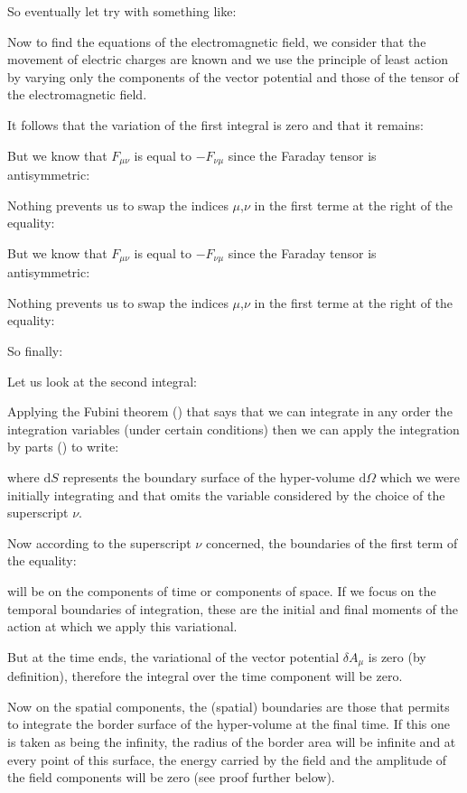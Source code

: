 	So eventually let try with something like:
	
	Now to find the equations of the electromagnetic field, we consider that the movement of electric charges are known and we use the principle of least action by varying only the components of the vector potential and those of the tensor of the electromagnetic field.

	It follows that the variation of the first integral is zero and that it remains:
	
	But we know that $F_{\mu\nu}$ is equal to $-F_{\nu\mu}$ since the Faraday tensor is antisymmetric:
	
	Nothing prevents us to swap the indices $\mu$,$\nu$ in the first terme at the right of the equality:
	
	But we know that $F_{\mu\nu}$ is equal to $-F_{\nu\mu}$ since the Faraday tensor is antisymmetric:
	
	Nothing prevents us to swap the indices $\mu$,$\nu$ in the first terme at the right of the equality:
	
	So finally:
	
	Let us look at the second integral:
	
	Applying the Fubini theorem () that says that we can integrate in any order the integration variables (under certain conditions) then we can apply the integration by parts () to write:
	
	where $\mathrm{d}S$ represents the boundary surface of the hyper-volume $\mathrm{d}\Omega$ which we were initially integrating and that omits the variable considered by the choice of the superscript $\nu$.

	Now according to the superscript $\nu$ concerned, the boundaries of the first term of the equality:
	
	will be on the components of time or components of space. If we focus on the temporal boundaries of integration, these are the initial and final moments of the action at which we apply this variational.
	
	But at the time ends, the variational of the vector potential $\delta A_\mu$ is zero (by definition), therefore the integral over the time component will be zero.

	Now on the spatial components, the (spatial) boundaries are those that permits to integrate the border surface of the hyper-volume at the final time. If this one is taken as being the infinity, the radius of the border area will be infinite and at every point of this surface, the energy carried by the field and the amplitude of the field components will be zero (see proof further below).

